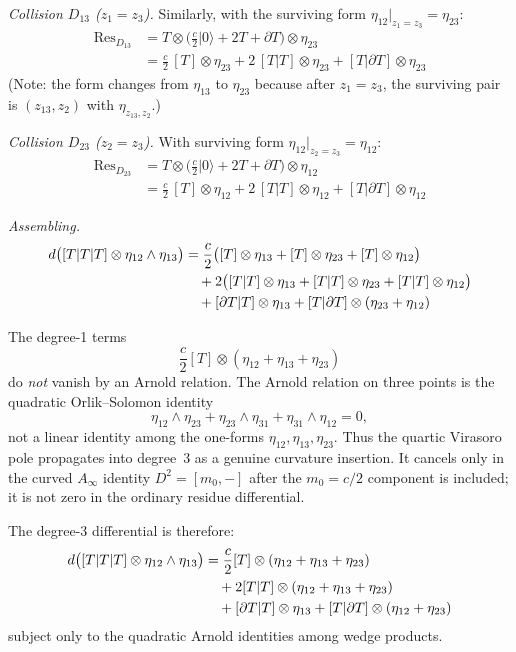 \begin{computation}
\emph{Collision $D_{13}$ ($z_1 = z_3$).}
Similarly, with the surviving form $\eta_{12}|_{z_1=z_3} = \eta_{23}$:
\begin{align*}
\operatorname{Res}_{D_{13}} &= T \otimes \bigl(\tfrac{c}{2}|0\rangle + 2T + \partial T\bigr)
\otimes \eta_{23} \\
&= \frac{c}{2}\,[T] \otimes \eta_{23}
+ 2\,[T|T] \otimes \eta_{23}
+ [T|\partial T] \otimes \eta_{23}
\end{align*}
(Note: the form changes from $\eta_{13}$ to $\eta_{23}$ because after
$z_1 = z_3$, the surviving pair is $(z_{13}, z_2)$ with $\eta_{z_{13},z_2}$.)

\emph{Collision $D_{23}$ ($z_2 = z_3$).}
With surviving form $\eta_{12}|_{z_2=z_3} = \eta_{12}$:
\begin{align*}
\operatorname{Res}_{D_{23}} &= T \otimes \bigl(\tfrac{c}{2}|0\rangle + 2T + \partial T\bigr)
\otimes \eta_{12} \\
&= \frac{c}{2}\,[T] \otimes \eta_{12}
+ 2\,[T|T] \otimes \eta_{12}
+ [T|\partial T] \otimes \eta_{12}
\end{align*}

\emph{Assembling.}
\begin{align}
d\bigl([T|T|T] \otimes \eta_{12}\wedge\eta_{13}\bigr)
&= \frac{c}{2}\bigl([T] \otimes \eta_{13}
+ [T] \otimes \eta_{23}
+ [T] \otimes \eta_{12}\bigr) \notag \\
&\quad + 2\bigl([T|T] \otimes \eta_{13}
+ [T|T] \otimes \eta_{23}
+ [T|T] \otimes \eta_{12}\bigr) \notag \\
&\quad + [\partial T|T] \otimes \eta_{13}
+ [T|\partial T] \otimes (\eta_{23} + \eta_{12})
\label{eq:vir-deg3-TTT}
\end{align}

The degree-1 terms
\[
\frac c2[T]\otimes(\eta_{12}+\eta_{13}+\eta_{23})
\]
do \emph{not} vanish by an Arnold relation. The Arnold relation on
three points is the quadratic Orlik--Solomon identity
\[
\eta_{12}\wedge\eta_{23}+\eta_{23}\wedge\eta_{31}
+\eta_{31}\wedge\eta_{12}=0,
\]
not a linear identity among the one-forms $\eta_{12},\eta_{13},\eta_{23}$.
Thus the quartic Virasoro pole propagates into degree~3 as a genuine
curvature insertion. It cancels only in the curved $A_\infty$ identity
$D^2=[m_0,-]$ after the $m_0=c/2$ component is included; it is not
zero in the ordinary residue differential.

The degree-$3$ differential is therefore:
\begin{align}
d\bigl([T|T|T] \otimes \eta_{12}\wedge\eta_{13}\bigr)
&= \frac{c}{2}[T]\otimes(\eta_{12}+\eta_{13}+\eta_{23}) \notag \\
&\quad + 2[T|T] \otimes (\eta_{12} + \eta_{13} + \eta_{23}) \notag \\
&\quad + [\partial T|T] \otimes \eta_{13}
+ [T|\partial T] \otimes (\eta_{12} + \eta_{23}) \notag \\
\label{eq:vir-deg3-TTT-simplified}
\end{align}
subject only to the quadratic Arnold identities among wedge products.
\end{computation}

